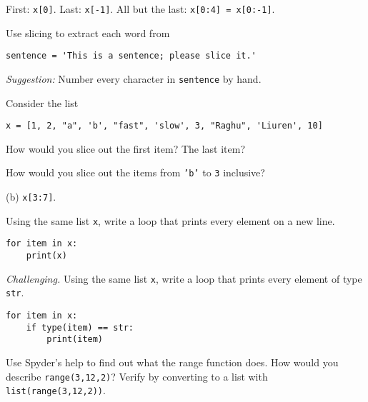 \documentclass[11pt]{exam}
\begin{document}
\begin{questions}
\begin{solution}
First:  {\tt x[0]}.  Last:  {\tt x[-1]}.  All but the last:  {\tt x[0:4] = x[0:-1]}.
\end{solution}


\item Use slicing to extract each word from
\begin{verbatim}
sentence = 'This is a sentence; please slice it.'
\end{verbatim}
{\it Suggestion:\/} Number every character in {\tt sentence} by hand.


\item Consider the list
\begin{verbatim}
x = [1, 2, "a", 'b', "fast", 'slow', 3, "Raghu", 'Liuren', 10]
\end{verbatim}
\begin{parts}
\item How would you slice out the first item?  The last item?
\item How would you slice out the items from {\tt 'b'} to {\tt 3} inclusive?
\end{parts}

\begin{solution}
(b) {\tt x[3:7]}.
\end{solution}

\item Using the same list {\tt x}, write a loop that prints every element on a new line.

\begin{solution}
\begin{verbatim}
for item in x:
    print(x)
\end{verbatim}
\end{solution}

\item {\it Challenging.\/}
Using the same list {\tt x}, write a loop that prints every element of type {\tt str}.

\begin{solution}
\begin{verbatim}
for item in x:
    if type(item) == str:
        print(item)
\end{verbatim}
\end{solution}


\item Use Spyder's help to find out what the range function does.
How would you describe {\tt range(3,12,2)}?
Verify by converting to a list with {\tt list(range(3,12,2))}.


\end{questions}
\end{document}
